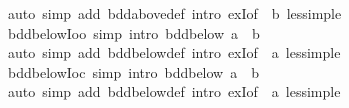 \begin{isabellebody}
\isamarkupfalse%
\ {\isacharparenleft}{\kern0pt}auto\ simp\ add{\isacharcolon}{\kern0pt}\ bdd{\isacharunderscore}{\kern0pt}above{\isacharunderscore}{\kern0pt}def\ intro{\isacharcolon}{\kern0pt}\ exI{\isacharbrackleft}{\kern0pt}of\ {\isacharunderscore}{\kern0pt}\ b{\isacharbrackright}{\kern0pt}\ less{\isacharunderscore}{\kern0pt}imp{\isacharunderscore}{\kern0pt}le{\isacharparenright}{\kern0pt}%
\endisatagproof
{\isafoldproof}%
%
\isadelimproof
\isanewline
%
\endisadelimproof
\isanewline
{}\isamarkupfalse%
\ bdd{\isacharunderscore}{\kern0pt}below{\isacharunderscore}{\kern0pt}Ioo\ {\isacharbrackleft}{\kern0pt}simp{\isacharcomma}{\kern0pt}\ intro{\isacharbrackright}{\kern0pt}{\isacharcolon}{\kern0pt}\ {\isachardoublequoteopen}bdd{\isacharunderscore}{\kern0pt}below\ {\isacharbraceleft}{\kern0pt}a\ {\isacharless}{\kern0pt}{\isachardot}{\kern0pt}{\isachardot}{\kern0pt}{\isacharless}{\kern0pt}\ b{\isacharbraceright}{\kern0pt}{\isachardoublequoteclose}\isanewline
%
\isadelimproof
\ \ %
\endisadelimproof
%
\isatagproof
{}\isamarkupfalse%
\ {\isacharparenleft}{\kern0pt}auto\ simp\ add{\isacharcolon}{\kern0pt}\ bdd{\isacharunderscore}{\kern0pt}below{\isacharunderscore}{\kern0pt}def\ intro{\isacharbang}{\kern0pt}{\isacharcolon}{\kern0pt}\ exI{\isacharbrackleft}{\kern0pt}of\ {\isacharunderscore}{\kern0pt}\ a{\isacharbrackright}{\kern0pt}\ less{\isacharunderscore}{\kern0pt}imp{\isacharunderscore}{\kern0pt}le{\isacharparenright}{\kern0pt}%
\endisatagproof
{\isafoldproof}%
%
\isadelimproof
\isanewline
%
\endisadelimproof
\isanewline
{}\isamarkupfalse%
\ bdd{\isacharunderscore}{\kern0pt}below{\isacharunderscore}{\kern0pt}Ioc\ {\isacharbrackleft}{\kern0pt}simp{\isacharcomma}{\kern0pt}\ intro{\isacharbrackright}{\kern0pt}{\isacharcolon}{\kern0pt}\ {\isachardoublequoteopen}bdd{\isacharunderscore}{\kern0pt}below\ {\isacharbraceleft}{\kern0pt}a\ {\isacharless}{\kern0pt}{\isachardot}{\kern0pt}{\isachardot}{\kern0pt}\ b{\isacharbraceright}{\kern0pt}{\isachardoublequoteclose}\isanewline
%
\isadelimproof
\ \ %
\endisadelimproof
%
\isatagproof
{}\isamarkupfalse%
\ {\isacharparenleft}{\kern0pt}auto\ simp\ add{\isacharcolon}{\kern0pt}\ bdd{\isacharunderscore}{\kern0pt}below{\isacharunderscore}{\kern0pt}def\ intro{\isacharbang}{\kern0pt}{\isacharcolon}{\kern0pt}\ exI{\isacharbrackleft}{\kern0pt}of\ {\isacharunderscore}{\kern0pt}\ a{\isacharbrackright}{\kern0pt}\ less{\isacharunderscore}{\kern0pt}imp{\isacharunderscore}{\kern0pt}le{\isacharparenright}{\kern0pt}%
\endisatagproof
{\isafoldproof}%
%
\isadelimproof
\isanewline

\end{isabellebody}
